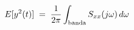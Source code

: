 \documentclass[preview]{standalone}
\begin{document}
\begin{align*}
\special{dvisvgm:raw <g id='unique000'>}E[y^2(t)] \;=\; \frac{1}{2\pi}\int_{\text{banda}} S_{xx}(j\omega)\, d\omega\special{dvisvgm:raw </g>}
\end{align*}
\end{document}
